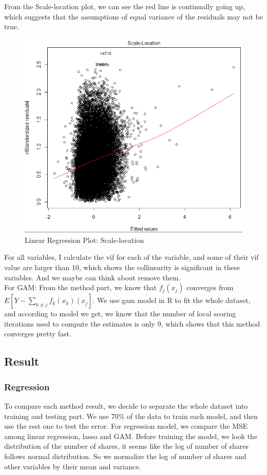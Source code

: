 \documentclass[11pt]{article}
\begin{document}
    From the Scale-location plot, we can see the red line is continually going up, which suggests that the assumptions of equal variance of the residuals may not be true.  \\
    
    \begin{figure}[h]
        \centering
        \includegraphics[width=0.7\linewidth]{linear_sl.png}
        \caption{Linear Regression Plot: Scale-location}
    \end{figure}
    
    For all variables, I calculate the vif for each of the variable, and some of their vif value are larger than 10, which shows the collinearity is significant in these variables. And we maybe can think about remove them. \\ 
    
For GAM: From the method part, we know that $f_j(x_j)$ converges from $E \left[Y-\sum_{k \neq j}f_k(x_k)\mid{x_j} \right]$. We use gam model in R to fit the whole dataset, and according to model we get, we know that the number of local scoring iterations used to compute the estimates is only 9, which shows that this method converges pretty fast.
\subsection{Result}
\subsubsection{Regression}
To compare each method result, we decide to separate the whole dataset into training and testing part. We use 70\% of the data to train each model, and then use the rest one to test the error. For regression model, we compare the MSE among linear regression, lasso and GAM. Before training the model, we look the distribution of the number of shares, it seems like the log of number of shares follows normal distribution. So we normalize the log of number of shares and other variables by their mean and variance.\\
\end{document}
